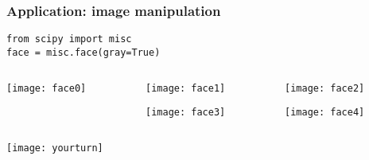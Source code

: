 \begin{frame}[fragile]\frametitle{Application: image manipulation}

 \begin{lstlisting}
from scipy import misc
face = misc.face(gray=True)
 \end{lstlisting}

 \vspace{-0.2truecm}
 \begin{columns}
  \begin{column}{0.33\linewidth}
   \begin{center}
    \texttt{[image: face0]}
    
    \vspace{2.4truecm}
   \end{center}
  \end{column}%
  \begin{column}{0.33\linewidth}
   \begin{center}
    \texttt{[image: face1]}

    \texttt{[image: face3]}
   \end{center}
  \end{column}%
  \begin{column}{0.33\linewidth}
   \begin{center}
    \texttt{[image: face2]}

    \texttt{[image: face4]}
   \end{center}
  \end{column}%
 \end{columns}

 \vspace{0.2truecm}
 \begin{center}
  \texttt{[image: yourturn]}
 \end{center}
\end{frame}